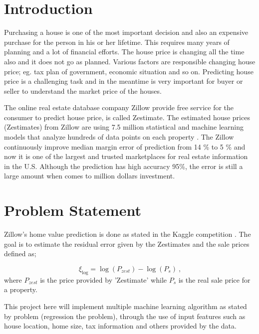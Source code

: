 \documentclass[12pt]{article}
\begin{document}
\maketitle

\section{Introduction}\label{sec:introduction}
Purchasing a house is one of the most important decision and also an expensive purchase for the person in his or her lifetime. This requires many years of planning and a lot of financial efforts. The house price is changing all the time also and it does not go as planned. Various factors are responsible changing house price; eg. tax plan of government, economic situation and so on. Predicting house price is a challenging task and in the meantime is very important for buyer or seller to understand the market price of the houses. 

The online real estate database company Zillow provide free service for the consumer to predict house price, is called Zestimate. The estimated house prices (Zestimates) from Zillow are using 7.5 million statistical and machine learning models that analyze hundreds of data points on each property \cite{kaggle}. The Zillow continuously improve median margin error of prediction from 14 \% to 5 \% and now it is one of the largest and trusted marketplaces for real estate information in the U.S. Although the prediction has high accuracy 95\%, the error is still a large amount when comes to million dollars investment. 

\section{Problem Statement}\label{sec:problemstate}
Zillow's home value prediction is done as stated in the Kaggle competition \cite{kaggle}. The goal is to estimate the residual error given by the Zestimates and the sale prices defined as;

\begin{equation}
\xi_{\log}=\log(P_{zest})-\log(P_s)~\text{,}
\label{eq:define-log-error}
\end{equation}
where $P_{zest}$ is the price provided by 'Zestimate' while $P_s$ is the real sale price for a property. 

This project here will implement multiple machine learning algorithm as stated by problem (regression the problem), through the use of input features such as house location, home size, tax information and others provided by the data. 
\end{document}
